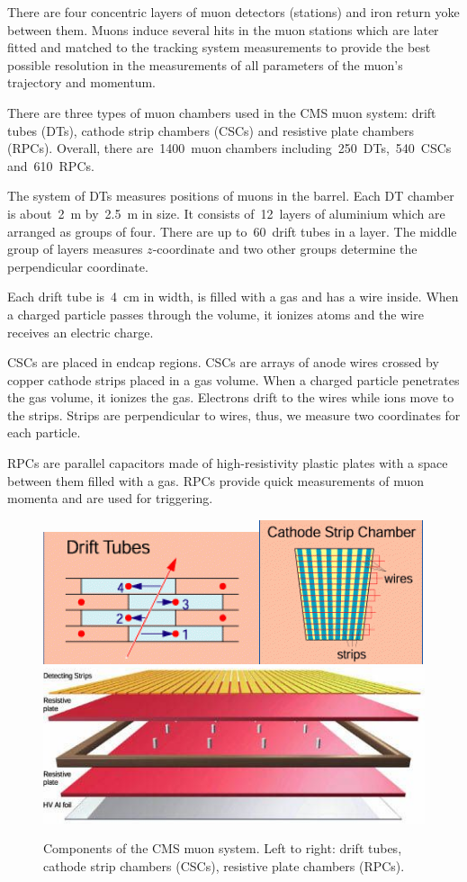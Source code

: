 There are four concentric layers of muon detectors (stations) and iron return yoke between them. Muons induce several hits in the muon stations which are later fitted and matched to the tracking system measurements to provide the best possible resolution in the measurements of all parameters of the muon's trajectory and momentum.

There are three types of muon chambers used in the CMS muon system: drift tubes (DTs), cathode strip chambers (CSCs) and resistive plate chambers (RPCs). Overall, there are~1400~muon chambers including~250~DTs,~540~CSCs and~610~RPCs.

The system of DTs measures positions of muons in the barrel. Each DT chamber is about~2~m by~2.5~m in size. It consists of~12~layers of aluminium which are arranged as groups of four. There are up to~60~drift tubes in a layer. The middle group of layers measures $z$-coordinate and two other groups determine the perpendicular coordinate.

Each drift tube is~4~cm in width, is filled with a gas and has a wire inside. When a charged particle passes through the volume, it ionizes atoms and the wire receives an electric charge.

CSCs are placed in endcap regions. CSCs are arrays of anode wires crossed by copper cathode strips placed in a gas volume. When a charged particle penetrates the gas volume, it ionizes the gas. Electrons drift to the wires while ions move to the strips. Strips are perpendicular to wires, thus, we measure two coordinates for each particle.  

RPCs are parallel capacitors made of high-resistivity plastic plates with a space between them filled with a gas. RPCs provide quick measurements of muon momenta and are used for triggering.  

\begin{figure}[htb]
  \begin{center}
    \includegraphics[height=2.5 cm]{../figs/Exp/muonSystem_driftTubes.png}\quad\includegraphics[height=2.5 cm]{../figs/Exp/muonSystem_CSC.png}\quad\includegraphics[height=2.5 cm]{../figs/Exp/muonSystem_RPC.png}
    \caption{Components of the CMS muon system. Left to right: drift tubes, cathode strip chambers (CSCs), resistive plate chambers (RPCs).}
    \label{fig:muonSystem}
  \end{center}
\end{figure}


